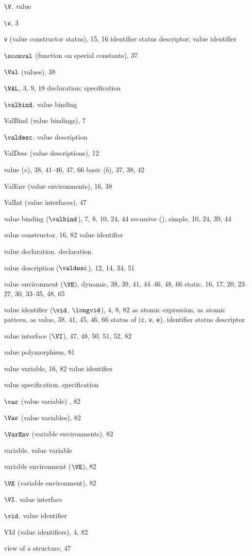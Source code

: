 \begin{theindex}
\item $\V$. \see value
\item \verb+\v+, 3
\item {\tt v} (value constructor status), 15, 16
\subitem \seealso identifier status descriptor; value identifier
\item $\sconval$ (function on special constants), 37
\item $\Val$ (values), 38
\item $\VAL$, 3, 9, 18
\subitem \seealso declaration; specification
\item $\valbind$. \see value binding
\item ValBind (value bindings), 7
\item $\valdesc$. \see value description
\item ValDesc (value descriptions), 12
\item value ($v$), 38, 41--46, 47, 66
\subitem basic ($b$), 37, 38, 42
\item ValEnv (value environments), 16, 38
\item ValInt (value interfaces), 47
\item value binding ($\valbind$), 7, 8, 10, 24, 44
\subitem recursive (), \recrefs
\subitem simple, 10, 24, 39, 44
\item value constructor, 16, 82
\subitem \seealso value identifier
\item value declaration. \see declaration
\item value description ($\valdesc$), 12, 14, 34, 51
\item value environment ($\VE$),
\subitem dynamic, 38, 39, 41,  44--46, 48, 66
\subitem static, 16, 17, 20, 23--27, 30, 33--35, 48, 65
\item value identifier ($\vid$, $\longvid$), 4, 8, 82
\subitem as atomic expression, \vidinatexprefs
\subitem as atomic pattern, \vidinatpatrefs
\subitem as value, 38, 41, 45, 46, 66
\subitem status of ({\tt c}, {\tt v}, {\tt e}), \see identifier status descriptor
\item value interface ($\VI$), 47, 48, 50, 51, 52, 82
\item value polymorphism, 81
\item value variable, 16, 82
\subitem \seealso value identifier
\item value specification. \see specification
\item $\var$ (value variable) , 82
\item $\Var$ (value variables), 82
\item $\VarEnv$ (variable environments), 82
\item variable. \see value variable
\item variable environment ($\VE$), 82
\item $\VE$ (variable environment), 82
\item $\VI$. \see value interface
\item $\vid$. \see value identifier
\item VId (value identifiers), 4, 82
\item view of a structure, 47
\indexspace


\end{theindex}
